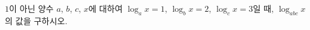 $1$이 아닌 양수 $a$, $b$, $c$, $x$에 대하여 $\log_a x=1$, $\log_b x=2$, $\log_c x=3$일 때, $\log_{abc} x$의 값을 구하시오.
